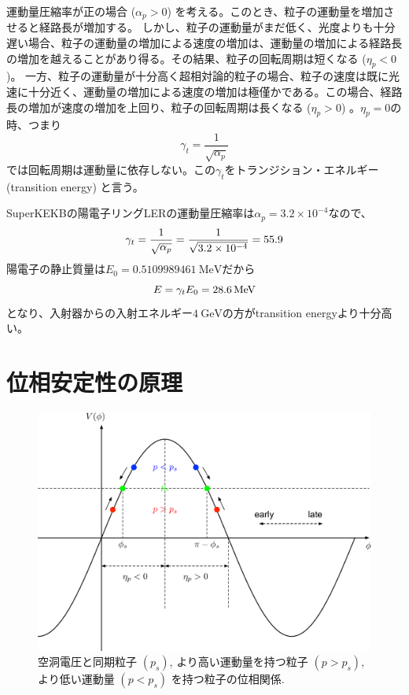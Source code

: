 \documentclass[10pt,a4paper]{ltjsarticle}
\begin{document}
運動量圧縮率が正の場合 ($\alpha_p>0$) を考える。このとき、粒子の運動量を増加させると経路長が増加する。 しかし、粒子の運動量がまだ低く、光度よりも十分遅い場合、粒子の運動量の増加による速度の増加は、運動量の増加による経路長の増加を越えることがあり得る。その結果、粒子の回転周期は短くなる ($\eta_p < 0$)。
一方、粒子の運動量が十分高く超相対論的粒子の場合、粒子の速度は既に光速に十分近く、運動量の増加による速度の増加は極僅かである。この場合、経路長の増加が速度の増加を上回り、粒子の回転周期は長くなる ($\eta_p>0$) 。$\eta_p = 0$の時、つまり
%
\begin{equation}
  \gamma_t = \frac{1}{\sqrt{\alpha_p}}
\end{equation}
%
では回転周期は運動量に依存しない。この$\gamma_t$をトランジション・エネルギー (transition energy) と言う。

\vspace{\baselineskip}

\begin{tcolorbox}[title=\textgt{SuperKEKB LERのtransition energy}]
  SuperKEKBの陽電子リングLERの運動量圧縮率は$\alpha_p = 3.2 \times 10^{-4}$なので、
  \begin{equation}
    \gamma_t = \frac{1}{\sqrt{\alpha_p}}= \frac{1}{\sqrt{3.2 \times 10^{-4}}} = 55.9 \notag
  \end{equation}
  陽電子の静止質量は$E_0 = \SI{0.5109989461}{\mega\electronvolt}$だから
  \begin{equation}
    E = \gamma_t E_0 = \SI{28.6}{\mega\electronvolt} \notag
  \end{equation}
  となり、入射器からの入射エネルギー$\SI{4}{\giga\electronvolt}$の方がtransition energyより十分高い。
\end{tcolorbox}

\section{位相安定性の原理}

\begin{figure}[hbt]
  \begin{center}
    \includegraphics[width=15cm,clip]{phase_stability.pdf}
    \caption{空洞電圧と同期粒子 $(p_s)$, より高い運動量を持つ粒子 $(p>p_s)$, より低い運動量 $(p<p_s)$ を持つ粒子の位相関係.}
    \label{phase_stability}
  \end{center}
\end{figure}
\end{document}

